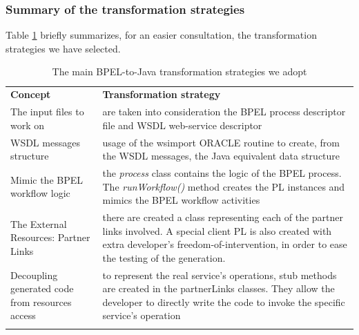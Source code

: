 \subsubsection{Summary of the transformation strategies}
\label{transfStrategySummary}
Table \ref{tab:transStrategies} briefly summarizes, for an easier consultation, the transformation strategies we have selected. 
\begin{table}
\caption{The main BPEL-to-Java transformation strategies we adopt}
\label{tab:transStrategies}
\begin{center}
\begin{tabular}{p{5cm} p{}}
						\toprule
						\addlinespace[0.2cm]
\textbf{Concept} 		& \textbf{Transformation strategy} 	\\ 
						\cmidrule(l){1-2}
The input files to work on 	
				& are taken into consideration the BPEL process descriptor file and WSDL web-service descriptor 			 			\\[0,5cm]
WSDL messages structure 	
				&  usage of the wsimport ORACLE routine to create, from the WSDL messages, the Java equivalent data structure  			\\[0,5cm]
Mimic the BPEL workflow logic 	
				& the \textit{process} class contains the logic of the BPEL process. The \textit{runWorkflow()} method creates the PL instances and mimics the BPEL workflow activities  			\\[0,5cm]
The External Resources: Partner Links 		
				&  there are created a class representing each of the partner links involved. A special client PL is also created with extra  developer's freedom-of-intervention, in order to ease the testing of the generation.	\\[0,5cm]
Decoupling generated code from resources access 
				& to represent the real service's operations, stub methods are created in the partnerLinks classes. They allow the developer to directly write the code to invoke the specific service's operation
				\\[0,5cm]
\addlinespace[0.2cm]
						\bottomrule
\end{tabular}
\end{center}
\end{table}
